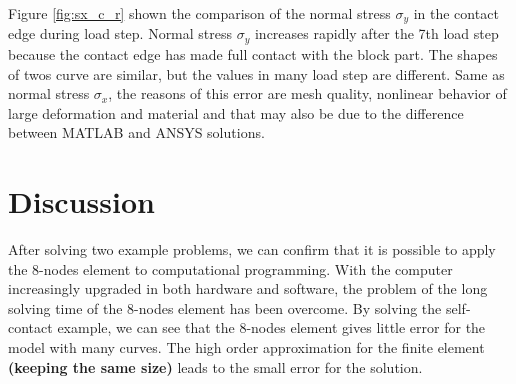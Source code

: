 Figure \ref{fig:sx_c_r} shown the comparison of the normal stress $\sigma_y$ in the contact edge during load step. Normal stress $\sigma_y$ increases rapidly after the 7th load step because the contact edge has made full contact with the block part.
The shapes of twos curve are similar, but the values in many load step are different. Same as normal stress $\sigma_x$,
the reasons of this error are mesh quality, nonlinear behavior of large deformation and material and that may also be due to the difference between MATLAB and ANSYS solutions.
\newline
\section{Discussion}
After solving two example problems, we can confirm that it is possible to apply the 8-nodes element to computational programming. With the computer increasingly upgraded in both hardware and software, the problem of the long solving time of the 8-nodes element has been overcome.
\vspace{0.38cm}
\newline
By solving the self-contact example, we can see that the 8-nodes element gives little error for the model with many curves.
The high order approximation for the finite element {\bf (keeping the same size)} leads to the small error for the solution.